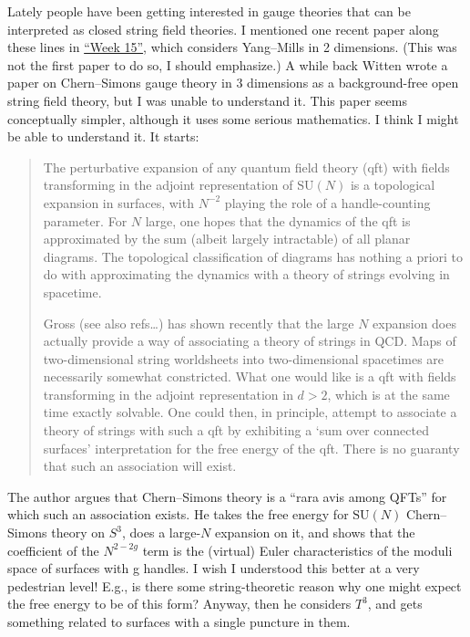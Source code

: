 \documentclass{article}
\def\tightlist{}
\renewcommand{\texttt}[1]{%
  \begingroup
  \ttfamily
  \begingroup\lccode`~=`/\lowercase{\endgroup\def~}{/\discretionary{}{}{}}%
  \begingroup\lccode`~=`[\lowercase{\endgroup\def~}{[\discretionary{}{}{}}%
  \begingroup\lccode`~=`.\lowercase{\endgroup\def~}{.\discretionary{}{}{}}%
  \catcode`/=\active\catcode`[=\active\catcode`.=\active
  \scantokens{#1\noexpand}%
  \endgroup
}
\begin{document}
\noindent
Lately people have been getting interested in gauge theories that can be
interpreted as closed string field theories. I mentioned one recent
paper along these lines in \protect\hyperlink{week15}{``Week 15''},
which considers Yang--Mills in 2 dimensions. (This was not the first
paper to do so, I should emphasize.) A while back Witten wrote a paper
on Chern--Simons gauge theory in 3 dimensions as a background-free open
string field theory, but I was unable to understand it. This paper seems
conceptually simpler, although it uses some serious mathematics. I think
I might be able to understand it. It starts:

\begin{quote}
The perturbative expansion of any quantum field theory (qft) with fields
transforming in the adjoint representation of \(\mathrm{SU}(N)\) is a
topological expansion in surfaces, with \(N^{-2}\) playing the role of a
handle-counting parameter. For \(N\) large, one hopes that the dynamics
of the qft is approximated by the sum (albeit largely intractable) of
all planar diagrams. The topological classification of diagrams has
nothing a priori to do with approximating the dynamics with a theory of
strings evolving in spacetime.

Gross (see also refs\ldots) has shown recently that the large \(N\)
expansion does actually provide a way of associating a theory of strings
in QCD. Maps of two-dimensional string worldsheets into two-dimensional
spacetimes are necessarily somewhat constricted. What one would like is
a qft with fields transforming in the adjoint representation in
\(d > 2\), which is at the same time exactly solvable. One could then,
in principle, attempt to associate a theory of strings with such a qft
by exhibiting a `sum over connected surfaces' interpretation for the
free energy of the qft. There is no guaranty that such an association
will exist.
\end{quote}

The author argues that Chern--Simons theory is a ``rara avis among QFTs''
for which such an association exists. He takes the free energy for
\(\mathrm{SU}(N)\) Chern--Simons theory on \(S^3\), does a large-\(N\)
expansion on it, and shows that the coefficient of the \(N^{2-2g}\) term
is the (virtual) Euler characteristics of the moduli space of surfaces
with g handles. I wish I understood this better at a very pedestrian
level! E.g., is there some string-theoretic reason why one might expect
the free energy to be of this form? Anyway, then he considers \(T^3\),
and gets something related to surfaces with a single puncture in them.
\end{document}
